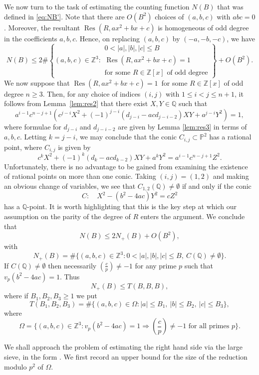 \documentclass[11pt]{article}
\DeclareMathOperator{\Res}{Res}
\newcommand{\PP}{\mathbb{P}}
\newcommand{\QQ}{\mathbb{Q}}\let\Q\QQ
\newcommand{\ZZ}{\mathbb{Z}}\let\Z\ZZ
\numberwithin{equation}{section}
\begin{document}
We
now turn to the task of estimating the counting function $N(B)$ that was defined in
\eqref{eq:NB'}.
Note that there are $O(B^2)$ choices of $(a,b,c)$ with $abc= 0$.
Moreover, the resultant $\Res(R,ax^2+bx+c)$ is homogeneous of odd degree
in the coefficients $a,b,c$. Hence, on replacing $(a,b,c)$ by $(-a,-b,-c)$, we have
\[
N(B)\leq
2\#\left\{(a,b,c)\in \ZZ^3:
\begin{array}{l}
0<|a|,|b|,|c|\leq B\\
\Res(R,ax^2+bx+c)=1\\
\text{for some $R\in \ZZ[x]$ of odd degree}
\end{array}
\right\}
+O(B^2).
\]
We now suppose that
$\Res(R,ax^2+bx+c)=1$\
for some $R\in \ZZ[x]$ of odd degree $n\geq 3$.
Then, for any choice of indices $(i,j)$ with $1\leq i<j\leq n+1$, it follows from Lemma~\ref{lem:res2} that
there exist $X,Y\in \QQ$ such that
\[
a^{i-1}c^{n-j+1}\left(c^{j-i}X^2+(-1)^{j-i}(d_{j-i}-acd_{j-i-2})XY+a^{j-i}Y^2\right)= 1,
\]
where formulae for $d_{j-i}$ and $d_{j-i-2}$ are given by Lemma \ref{lem:res3} in
terms of $a,b,c$.
Letting $k=j-i$, we may conclude that the conic $C_{i,j}\subset \PP^2$
has a rational point, where $C_{i,j}$ is given by
\[
c^{k}X^2+(-1)^{k}(d_{k}-acd_{k-2})XY+a^{k}Y^2= a^{i-1}c^{n-j+1}Z^2.
\]
Unfortunately, there is no advantage to be gained from
examining the existence of rational points on more than one conic.
Taking $(i,j)=(1,2)$ and making an obvious change of variables, we see that $C_{1,2}(\QQ)\neq \emptyset$ if and only if
the conic
\[
C: \quad X^2-(b^2-4ac)Y^2=cZ^2
\]
has a $\QQ$-point. It is worth highlighting that this is the key step at which our assumption on the parity of the degree of $R$ enters the argument. We conclude that
\begin{equation}\label{eq:comic}
N(B)\leq 2N_+(B)+O(B^2),
\end{equation}
with
\[
N_+(B)=
\#\bigl\{(a,b,c)\in \ZZ^3:
0<|a|,|b|,|c|\leq B,~
C(\QQ)\neq \emptyset
\bigr\}.
\]
If $C(\QQ)\neq \emptyset$ then necessarily
$(\frac{c}{p})\neq -1$
for any prime $p$ such that $v_p(b^2-4ac)=1$.
Thus
\begin{equation}\label{eq:book}
N_+(B)\leq
T(B,B,B),
\end{equation}
where
if $B_1,B_2,B_3\geq 1$ we put
\[
T(B_1,B_2,B_3)=
\#\bigl\{(a,b,c)\in \Omega:
|a|\leq B_1,~|b|\leq B_2,~|c|\leq B_3
\bigr\},
\]
where
\[
\Omega=
\biggl\{(a,b,c)\in \ZZ^3:
v_p(b^2-4ac)=1\Rightarrow \left(\frac{c}{p}\right)\neq -1
\text{ for all primes $p$}\biggr\}.
\]

We shall approach the problem of estimating the right hand side via the
large sieve,
in the form
\cite[Lem.\,6.3]{large}.
We first record an upper bound for the size of the reduction modulo $p^2$ of $\Omega$.
\end{document}
